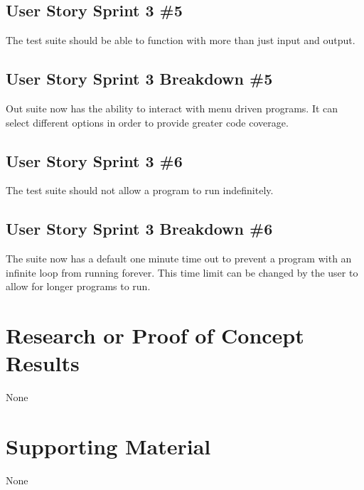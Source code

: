 \subsection{User Story Sprint 3 \#5}
The test suite should be able to function with more than just input and output.

\subsection{User Story Sprint 3 Breakdown \#5}
Out suite now has the ability to interact with menu driven programs. It can select different options in order to provide greater code coverage.

\subsection{User Story Sprint 3 \#6}
The test suite should not allow a program to run indefinitely.

\subsection{User Story Sprint 3 Breakdown \#6}
The suite now has a default one minute time out to prevent a program with an infinite loop from running forever. This time limit can be changed by the user to allow for longer programs to run.


\section{Research or Proof of Concept Results}
None


\section{Supporting Material}
None

